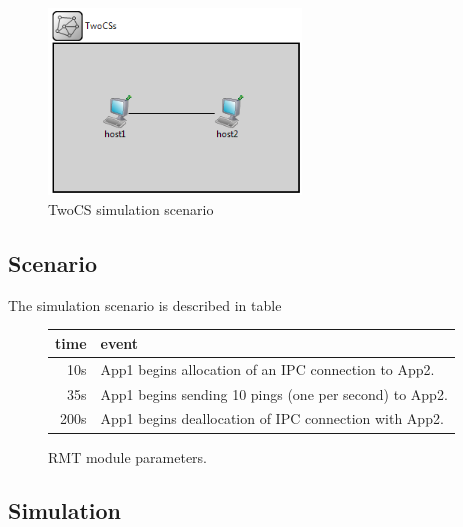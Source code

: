             \begin{figure}[H]
                \begin{center}
                    \includegraphics[width=0.6\textwidth]{fig/examples-twocs.png}
                  \caption{TwoCS simulation scenario}
                  \label{fig:examples:twocs}
                \end{center}
            \end{figure}

        \subsection{Scenario}

            The simulation scenario is described in table

            \begin{figure}[H]
                \begin{center}
                  \begin{tabular}{ r | l }
                    time & event \\
                    \hline
                    10s & App1 begins allocation of an IPC connection to App2. \\
                    35s & App1 begins sending 10 pings (one per second) to App2. \\
                    200s & App1 begins deallocation of IPC connection with App2. \\
                    \hline
                  \end{tabular}
                  \caption{RMT module parameters.}
                  \label{fig:rmt_params}
                \end{center}
            \end{figure}

        \subsection{Simulation}

